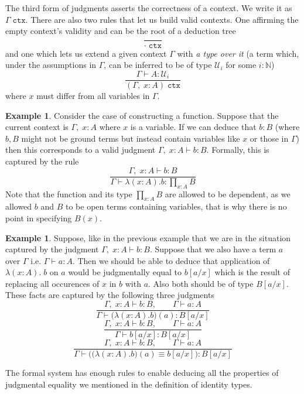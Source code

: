 \documentclass[12pt]{report}
\theoremstyle{definition}
\newtheorem{exmp}[thm]{Example}
\begin{document}
The third form of judgments asserts the correctness of a context. 
We write it as $\Gamma\; \mathtt{ctx}$. 
There are also two rules that let us build valid contexts. 
One affirming the empty context's validity and can be the root of a deduction tree
$$\frac{~}{\cdot\; \mathtt{ctx}}$$
and one which lets us extend a given context $\Gamma$ with \textit{a type over it} (a term which, under the assumptions in $\Gamma$, can be inferred to be of type $\mathcal{U}_i$ for some $i : \mathbb{N}$)
$$\frac{\Gamma \vdash A : \mathcal{U}_i}{(\Gamma,\; x: A)\; \mathtt{ctx}}$$
where $x$ must differ from all variables in $\Gamma$. 
\begin{exmp}
Consider the case of constructing a function. 
Suppose that the current context is $\Gamma,\;x : A$ where $x$ is a variable. 
If we can deduce that $b : B$ (where $b, B$ might not be ground terms but instead contain variables like $x$ or those in $\Gamma$) then this corresponds to a valid judgment $\Gamma,\;x :A \vdash b : B$. 
Formally, this is captured by the rule
$$\frac{\Gamma,\;x : A \vdash b : B}{\Gamma \vdash \lambda(x : A).b : \prod_{x : A}B}$$
Note that the function and its type $\prod_{x : A}B$ are allowed to be dependent, as we allowed $b$ and $B$ to be open terms containing variables, that is why there is no point in specifying $B(x)$. 
\end{exmp} 
\begin{exmp}
Suppose, like in the previous example that we are in the situation captured by the judgment $\Gamma,\;x :A \vdash b : B$. Suppose that we also have a term $a$ over $\Gamma$ i.e. $\Gamma \vdash a : A$. 
Then we should be able to deduce that application of $\lambda(x : A).\;b$ on $a$ would be judgmentally equal to $b[a/x]$ which is the result of replacing all occurences of $x$ in $b$ with $a$. 
Also both should be of type $B[a/x]$. 
These facts are captured by the following three judgments
$$\frac{\Gamma,\;x : A \vdash b : B,\qquad \Gamma \vdash a : A}{\Gamma \vdash \big(\lambda(x : A).b\big)(a) : B[a/x]}$$
$$\frac{\Gamma,\;x : A \vdash b : B,\qquad \Gamma \vdash a : A}{\Gamma \vdash b[a/x] : B[a/x]}$$
$$\frac{\Gamma,\;x : A \vdash b : B,\qquad \Gamma \vdash a : A}{\Gamma \vdash \Big(\big(\lambda(x : A).b\big)(a) \equiv b[a/x]\Big) : B[a/x]}$$

The formal system has enough rules to enable deducing all the properties of judgmental equality we mentioned in the definition of identity types.
\end{exmp}

\printbibliography
\end{document}
